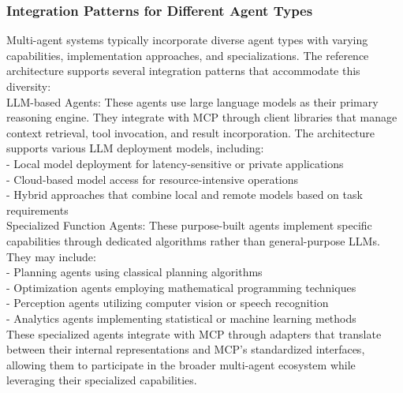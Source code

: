 \subsubsection{Integration Patterns for Different Agent Types}
Multi-agent systems typically incorporate diverse agent types with varying capabilities, implementation approaches, and specializations. The reference architecture supports several integration patterns that accommodate this diversity:\\ \newline
LLM-based Agents: These agents use large language models as their primary reasoning engine. They integrate with MCP through client libraries that manage context retrieval, tool invocation, and result incorporation. The architecture supports various LLM deployment models, including:\\ \newline
- Local model deployment for latency-sensitive or private applications\\ \newline
- Cloud-based model access for resource-intensive operations\\ \newline
- Hybrid approaches that combine local and remote models based on task requirements\\ \newline
Specialized Function Agents: These purpose-built agents implement specific capabilities through dedicated algorithms rather than general-purpose LLMs. They may include:\\ \newline
- Planning agents using classical planning algorithms\\ \newline
- Optimization agents employing mathematical programming techniques\\ \newline
- Perception agents utilizing computer vision or speech recognition\\ \newline
- Analytics agents implementing statistical or machine learning methods\\ \newline
These specialized agents integrate with MCP through adapters that translate between their internal representations and MCP's standardized interfaces, allowing them to participate in the broader multi-agent ecosystem while leveraging their specialized capabilities.\\ \newline
